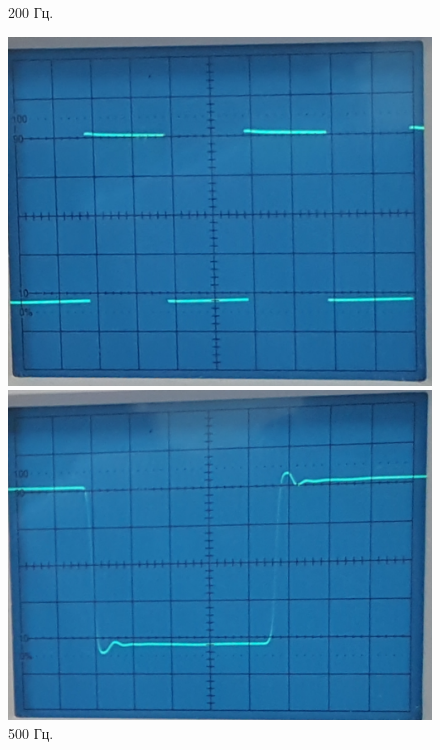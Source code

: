 \documentclass[12pt,a4paper]{article}
\begin{document}
\begin{figure}[h!]
\begin{center}
\begin{minipage}[h]{0.32\linewidth}
				\caption{200 Гц.}
				\label{ris:meandr_200Hz}
			\end{minipage}
		\hfill
			\begin{minipage}[h]{0.32\linewidth}
				\includegraphics[width=1\linewidth]{meandr_500Hz}
				\caption{500 Гц.} %
				\label{ris:meandr_500Hz} %
			\end{minipage}
		\end{center}
		\begin{center}
			\begin{minipage}[h]{0.32\linewidth}
				\includegraphics[width=1\linewidth]{meandr_500kHz}

\end{minipage}
\end{center}
\end{figure}
\end{document}

